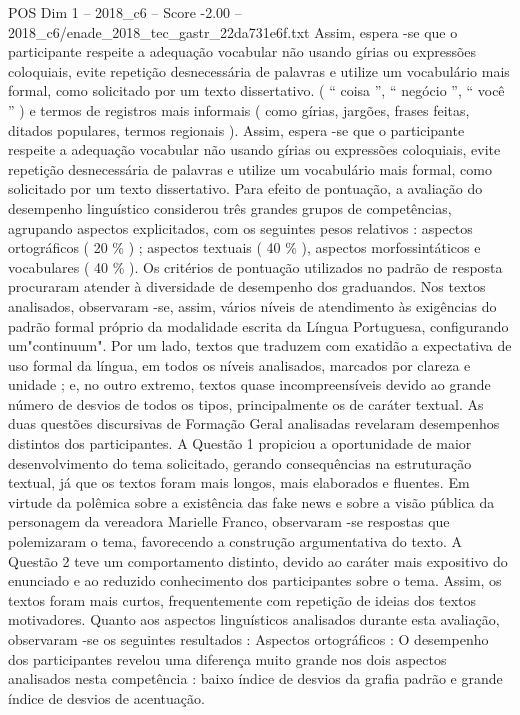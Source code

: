 \begin{textsample}{POS Dim 1 – 2018\_c6 – Score -2.00 – 2018\_c6/enade\_2018\_tec\_gastr\_22da731e6f.txt}
Assim, espera -se que o participante respeite a adequação vocabular não usando gírias ou expressões coloquiais, evite repetição desnecessária de palavras e utilize um vocabulário mais formal, como solicitado por um texto dissertativo. ( “ coisa ”, “ negócio ”, “ você ” ) e termos de registros mais informais ( como gírias, jargões, frases feitas, ditados populares, termos regionais ).
Assim, espera -se que o participante respeite a adequação vocabular não usando gírias ou expressões coloquiais, evite repetição desnecessária de palavras e utilize um vocabulário mais formal, como solicitado por um texto dissertativo.
Para efeito de pontuação, a avaliação do desempenho linguístico considerou três grandes grupos de competências, agrupando aspectos explicitados, com os seguintes pesos relativos : aspectos ortográficos ( 20 \% ) ; aspectos textuais ( 40 \% ), aspectos morfossintáticos e vocabulares ( 40 \% ).
Os critérios de pontuação utilizados no padrão de resposta procuraram atender à diversidade de desempenho dos graduandos.
Nos textos analisados, observaram -se, assim, vários níveis de atendimento às exigências do padrão formal próprio da modalidade escrita da Língua Portuguesa, configurando um"continuum".
Por um lado, textos que traduzem com exatidão a expectativa de uso formal da língua, em todos os níveis analisados, marcados por clareza e unidade ; e, no outro extremo, textos quase incompreensíveis devido ao grande número de desvios de todos os tipos, principalmente os de caráter textual.
As duas questões discursivas de Formação Geral analisadas revelaram desempenhos distintos dos participantes.
A Questão 1 propiciou a oportunidade de maior desenvolvimento do tema solicitado, gerando consequências na estruturação textual, já que os textos foram mais longos, mais elaborados e fluentes.
Em virtude da polêmica sobre a existência das fake news e sobre a visão pública da personagem da vereadora Marielle Franco, observaram -se respostas que polemizaram o tema, favorecendo a construção argumentativa do texto.
A Questão 2 teve um comportamento distinto, devido ao caráter mais expositivo do enunciado e ao reduzido conhecimento dos participantes sobre o tema.
Assim, os textos foram mais curtos, frequentemente com repetição de ideias dos textos motivadores.
Quanto aos aspectos linguísticos analisados durante esta avaliação, observaram -se os seguintes resultados : Aspectos ortográficos : O desempenho dos participantes revelou uma diferença muito grande nos dois aspectos analisados nesta competência : baixo índice de desvios da grafia padrão e grande índice de desvios de acentuação.

\end{textsample}
